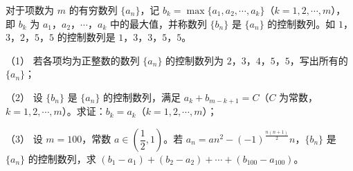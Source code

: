 \begin{question}
对于项数为 $m$ 的有穷数列 $\{a_n\}$，记 $b_k=\max\{a_1,a_2,\cdots,a_k\}$（$k=1,2,\cdots,m$），即 $b_k$ 为 $a_1$，$a_2$，$\cdots$，$a_k$ 中的最大值，并称数列 $\{b_n\}$ 是 $\{a_n\}$ 的控制数列。如 $1$，$3$，$2$，$5$，$5$ 的控制数列是 $1$，$3$，$3$，$5$，$5$。

（1） 若各项均为正整数的数列 $\{a_n\}$ 的控制数列为 $2$，$3$，$4$，$5$，$5$，写出所有的 $\{a_n\}$；

（2） 设 $\{b_n\}$ 是 $\{a_n\}$ 的控制数列，满足 $a_k+b_{m-k+1}=C$（$C$ 为常数，$k=1,2,\cdots,m$）。求证：$b_k=a_k$（$k=1,2,\cdots,m$）；

（3） 设 $m=100$，常数 $a\in\left(\dfrac12,1\right)$。若 $a_n=an^2-(-1)^{\frac{n(n+1)}2}n$，$\{b_n\}$ 是 $\{a_n\}$ 的控制数列，求 $(b_1-a_1)+(b_2-a_2)+\cdots+(b_{100}-a_{100})$。

\clearpage

\end{question}